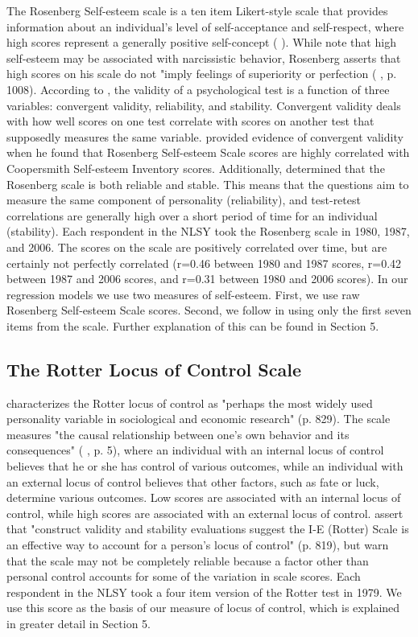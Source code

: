 \documentclass[12pt]{report}
\newcommand{\citee}[1]{\citename{#1} \citeyear{#1}}
\begin{document}
The Rosenberg Self-esteem scale is a ten item Likert-style scale that provides information about an individual's level of self-acceptance and self-respect, where high scores represent a generally positive self-concept (\citee{RSS1989}). While \citee{B2003} note that high self-esteem may be associated with narcissistic behavior, Rosenberg asserts that high scores on his scale do not "imply feelings of superiority or perfection (\citee{RSS1989}, p. 1008). According to \citee{W2006}, the validity of a psychological test is a function of three variables: convergent validity, reliability, and stability. Convergent validity deals with how well scores on one test correlate with scores on another test that supposedly measures the same variable. \citee{D1985} provided evidence of convergent validity when he found that Rosenberg Self-esteem Scale scores are highly correlated with Coopersmith Self-esteem Inventory scores.  Additionally, \citee{FC1984} determined that the Rosenberg scale is both reliable and stable. This means that the questions aim to measure the same component of personality (reliability), and test-retest correlations are generally high over a short period of time for an individual (stability). Each respondent in the NLSY took the Rosenberg scale in 1980, 1987, and 2006. The scores on the scale are positively correlated over time, but are certainly not perfectly correlated (r=0.46 between 1980 and 1987 scores, r=0.42 between 1987 and 2006 scores, and r=0.31 between 1980 and 2006 scores). In our regression models we use two measures of self-esteem. First, we use raw Rosenberg Self-esteem Scale scores. Second, we follow \citee{M2001} in using only the first seven items from the scale. Further explanation of this can be found in Section 5.

\subsection*{The Rotter Locus of Control Scale}


\citee{O2005} characterizes the Rotter locus of control as "perhaps the most widely used personality variable in sociological and economic research" (p. 829). The scale measures "the causal relationship between one's own behavior and its consequences" (\citee{PP2010}, p. 5), where an individual with an internal locus of control believes that he or she has control of various outcomes, while an individual with an external locus of control believes that other factors, such as fate or luck, determine various outcomes. Low scores are associated with an internal locus of control, while high scores are associated with an external locus of control. \citee{GVD1997} assert that "construct validity and stability evaluations suggest the I-E (Rotter) Scale is an effective way to account for a person's locus of control" (p. 819), but warn that the scale may not be completely reliable because a factor other than personal control accounts for some of the variation in scale scores. Each respondent in the NLSY took a four item version of the Rotter test in 1979. We use this score as the basis of our measure of locus of control, which is explained in greater detail in Section 5.
\end{document}
